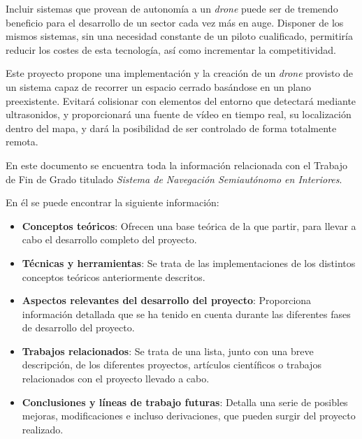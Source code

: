 Incluir sistemas que provean de autonomía a un \emph{drone} puede ser de tremendo beneficio para el desarrollo de un sector cada vez más en auge. Disponer de los mismos sistemas, sin una necesidad constante de un piloto cualificado, permitiría reducir los costes de esta tecnología, así como incrementar la competitividad.

Este proyecto propone una implementación y la creación de un \emph{drone} provisto de un sistema capaz de recorrer un espacio cerrado basándose en un plano preexistente. Evitará colisionar con elementos del entorno que detectará mediante ultrasonidos, y proporcionará una fuente de vídeo en tiempo real, su localización dentro del mapa, y dará la posibilidad de ser controlado de forma totalmente remota.

En este documento se encuentra toda la información relacionada con el Trabajo de Fin de Grado titulado \textit{Sistema de Navegación Semiautónomo en Interiores}.

En él se puede encontrar la siguiente información:
\begin{itemize}
\item \textbf{Conceptos teóricos}: Ofrecen una base teórica de la que partir, para llevar a cabo el desarrollo completo del proyecto.
\item \textbf{Técnicas y herramientas}: Se trata de las implementaciones de los distintos conceptos teóricos anteriormente descritos.
\item \textbf{Aspectos relevantes del desarrollo del proyecto}: Proporciona información detallada que se ha tenido en cuenta durante las diferentes fases de desarrollo del proyecto.
\item \textbf{Trabajos relacionados}: Se trata de una lista, junto con una breve descripción, de los diferentes proyectos, artículos científicos o trabajos relacionados con el proyecto llevado a cabo.
\item \textbf{Conclusiones y líneas de trabajo futuras}: Detalla una serie de posibles mejoras, modificaciones e incluso derivaciones, que pueden surgir del proyecto realizado.
\end{itemize}
